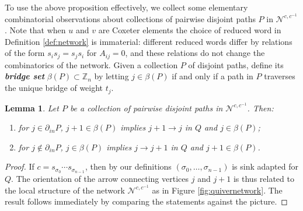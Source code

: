 \documentclass[12pt]{amsart}
\newcommand{\newword}[1]{\textbf{\emph{#1}}}
\newcommand{\ZZ}{\mathbb{Z}}
\newcommand{\cN}{\mathcal{N}} %
\newtheorem{lemma}[theorem]{Lemma}
\theoremstyle{remark}
\numberwithin{equation}{section}
\numberwithin{figure}{section}
\begin{document}
To use the above proposition effectively, we collect some elementary combinatorial observations about collections of pairwise disjoint paths $P$ in $\cN^{c,c^{-1}}$. Note that when $u$ and $v$ are Coxeter elements the choice of reduced word in Definition \ref{def:network} is immaterial: different reduced words differ by relations of the form $s_i s_j = s_j s_i$ for $A_{ij} = 0$, and these relations do not change the combinatorics of the network. Given a collection $P$ of disjoint paths, define its \newword{bridge set} $\beta(P)\subset\ZZ_n$ by letting $j\in\beta(P)$ if and only if a path in $P$ traverses the unique bridge of weight $t_j$.


\begin{lemma}\label{lem:phi}
  Let $P$ be a collection of pairwise disjoint paths in $\cN^{c,c^{-1}}$.  Then:
  \begin{enumerate}
    \item for $j\in\partial_{in}P$, $j+1\in\beta(P)$ implies $j+1\to j$ in $Q$ and $j\in\beta(P)$;
    \item for $j\notin\partial_{in}P$, $j\in\beta(P)$ implies $j\to j+1$ in $Q$ and $j+1\in\beta(P)$.
  \end{enumerate}
\end{lemma}
\begin{proof}
If $c = s_{\sigma_0}\cdots s_{\sigma_{n-1}}$, then by our definitions $(\sigma_0,\ldots,\sigma_{n-1})$ is sink adapted for $Q$. The orientation of the arrow connecting vertices $j$ and $j+1$ is thus related to the local structure of the network $\cN^{c,c^{-1}}$ as in Figure \ref{fig:quivernetwork}. The result follows immediately by comparing the statements against the picture.
\end{proof} 
\end{document}
